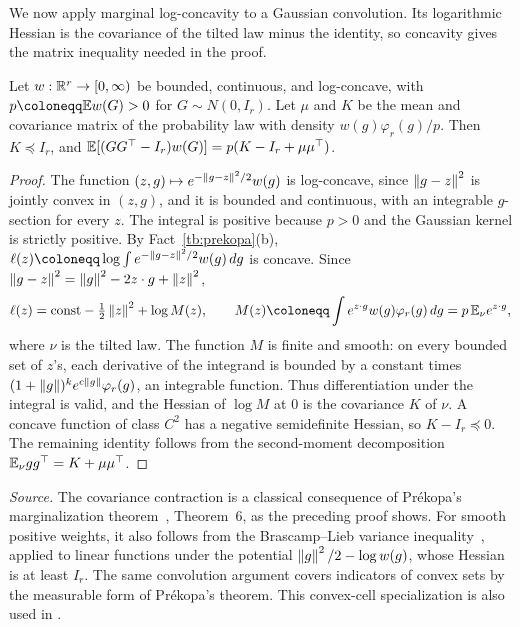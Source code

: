 We now apply marginal log-concavity to a Gaussian convolution. Its
logarithmic Hessian is the covariance of the tilted law minus the
identity, so concavity gives the matrix inequality needed in the proof.

\begin{fact}\label{tb:tilt}
Let \(w:\mathbb R^r\to[0,\infty)\) be bounded, continuous, and log-concave, with
\(p\coloneqq \E w(G)>0\) for \(G\sim N(0,I_r)\). Let \(\mu\) and \(K\) be the mean and
covariance matrix of the probability law with density \(w(g)\varphi_r(g)/p\).
Then \(K\preceq I_r\), and
\(\mathbb E[(GG^\top-I_r)w(G)]=p(K-I_r+\mu\mu^\top)\).
\end{fact}

\begin{proof}
The function \((z,g)\mapsto e^{-\left\lVert g-z\right\rVert^2/2}w(g)\) is log-concave, since
\(\left\lVert g-z\right\rVert^2\) is jointly convex in \((z,g)\), and it is bounded and
continuous, with an integrable \(g\)-section for every \(z\).
The integral is positive because \(p>0\) and the Gaussian kernel is
strictly positive. By Fact~\ref{tb:prekopa}(b), \(\ell(z)\coloneqq \log\int e^{-\norm{g-z}^2/2}
w(g)\,dg\) is concave. Since \(\left\lVert g-z\right\rVert^2=\left\lVert g\right\rVert^2-2z\cdot g+\left\lVert z\right\rVert^2\),
\[
 \ell(z)=\text{const}-\tfrac12\norm z^2+\log M(z),\qquad
 M(z)\coloneqq \int e^{z\cdot g}w(g)\varphi_r(g)\,dg=p\,\E_\nu e^{z\cdot g},
\]
where \(\nu\) is the tilted law. The function \(M\) is finite and smooth: on every bounded set of
\(z\)'s, each derivative of the integrand is bounded by a constant
times \((1+\left\lVert g\right\rVert)^k e^{c\left\lVert g\right\rVert}\varphi_r(g)\), an integrable function.
Thus differentiation under the integral is valid, and the Hessian of \(\log M\) at \(0\) is the
covariance \(K\) of \(\nu\). A concave function of class \(C^2\) has a
negative semidefinite Hessian, so \(K-I_r\preceq0\). The remaining identity
follows from the second-moment decomposition \(\mathbb E_\nu gg^\top=K+\mu\mu^\top\).
\end{proof}

\emph{Source.} The covariance contraction is a classical consequence of
Pr\'ekopa's marginalization theorem~, Theorem~6, as the
preceding proof shows. For smooth positive weights, it also follows
from the Brascamp--Lieb variance inequality~, applied to
linear functions under the potential \(\left\lVert g\right\rVert^2/2-\log w(g)\), whose
Hessian is at least \(I_r\). The same convolution argument covers
indicators of convex sets by the measurable form of Pr\'ekopa's
theorem. This convex-cell specialization is also used in .

